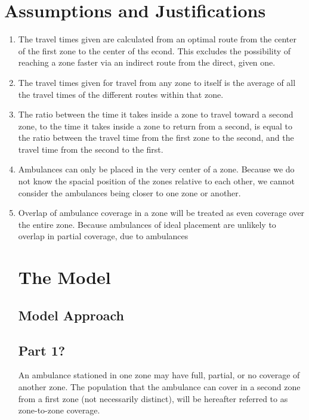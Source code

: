 \documentclass[notitlepage, 12pt]{article}
\begin{document}
\section{Assumptions and Justifications}
\begin{enumerate}
    \item The travel times given are calculated from an optimal route from the center of the first
        zone to the center of ths econd. This excludes the possibility of reaching a zone faster
        via an indirect route from the direct, given one.
    \item The travel times given for travel from any zone to itself is the average
        of all the travel times of the different routes within that zone.
    \item The ratio between the time it takes inside a zone to travel toward a second zone,
        to the time it takes inside a zone to return from a second, is equal to the ratio
        between the travel time from the first zone to the second, and the travel time from the
        second to the first.
    \item
        Ambulances can only be placed in the very center of a zone. Because we do not know the
        spacial position of the zones relative to each other, we cannot consider the ambulances
        being closer to one zone or another.
    \item
        Overlap of ambulance coverage in a zone will be treated as even coverage over the entire
        zone. Because ambulances of ideal placement are unlikely to overlap in partial coverage, due to
        ambulances  %

\section{The Model}

\subsection{Model Approach}

\subsection{Part 1?}
An ambulance stationed in one zone may have full, partial, or no coverage of another zone. The population
that the ambulance can cover in a second zone from a first zone (not necessarily distinct), will be hereafter referred to as
zone-to-zone coverage.


\end{enumerate}
\end{document}

